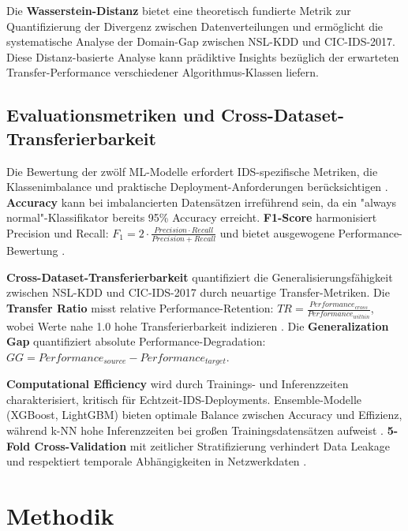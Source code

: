 \documentclass[11pt,a4paper]{article}
\begin{document}
    Die \textbf{Wasserstein-Distanz} bietet eine theoretisch fundierte Metrik zur Quantifizierung der Divergenz zwischen Datenverteilungen und ermöglicht die systematische Analyse der Domain-Gap zwischen NSL-KDD und CIC-IDS-2017. Diese Distanz-basierte Analyse kann prädiktive Insights bezüglich der erwarteten Transfer-Performance verschiedener Algorithmus-Klassen liefern.

    \subsection{Evaluationsmetriken und Cross-Dataset-Transferierbarkeit}

    Die Bewertung der zwölf ML-Modelle erfordert IDS-spezifische Metriken, die Klassenimbalance und praktische Deployment-Anforderungen berücksichtigen \parencite{Belavagi2016}. \textbf{Accuracy} kann bei imbalancierten Datensätzen irreführend sein, da ein "always normal"-Klassifikator bereits 95\% Accuracy erreicht. \textbf{F1-Score} harmonisiert Precision und Recall: $F_1 = 2 \cdot \frac{Precision \cdot Recall}{Precision + Recall}$ und bietet ausgewogene Performance-Bewertung \parencite{Hastie2009}.

    \textbf{Cross-Dataset-Transferierbarkeit} quantifiziert die Generalisierungsfähigkeit zwischen NSL-KDD und CIC-IDS-2017 durch neuartige Transfer-Metriken. Die \textbf{Transfer Ratio} misst relative Performance-Retention: $TR = \frac{Performance_{cross}}{Performance_{within}}$, wobei Werte nahe 1.0 hohe Transferierbarkeit indizieren \parencite{Mourouzis2021}. Die \textbf{Generalization Gap} quantifiziert absolute Performance-Degradation: $GG = Performance_{source} - Performance_{target}$.

    \textbf{Computational Efficiency} wird durch Trainings- und Inferenzzeiten charakterisiert, kritisch für Echtzeit-IDS-Deployments. Ensemble-Modelle (XGBoost, LightGBM) bieten optimale Balance zwischen Accuracy und Effizienz, während k-NN hohe Inferenzzeiten bei großen Trainingsdatensätzen aufweist \parencite{Vinayakumar2019}. \textbf{5-Fold Cross-Validation} mit zeitlicher Stratifizierung verhindert Data Leakage und respektiert temporale Abhängigkeiten in Netzwerkdaten \parencite{Tavallaee2009}.

    \section{Methodik}
\end{document}
